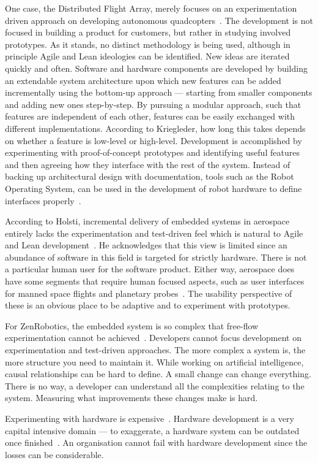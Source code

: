 \documentclass[english]{tktltiki2}
\begin{document}
One case, the Distributed Flight Array, merely focuses on an experimentation driven approach on developing autonomous quadcopters~\cite{Kri15}. The development is not focused in building a product for customers, but rather in studying involved prototypes. As it stands, no distinct methodology is being used, although in principle Agile and Lean ideologies can be identified. New ideas are iterated quickly and often. Software and hardware components are developed by building an extendable system architecture upon which new features can be added incrementally using the bottom-up approach — starting from smaller components and adding new ones step-by-step. By pursuing a modular approach, such that features are independent of each other, features can be easily exchanged with different implementations. According to Kriegleder, how long this takes depends on whether a feature is low-level or high-level. Development is accomplished by experimenting with proof-of-concept prototypes and identifying useful features and then agreeing how they interface with the rest of the system. Instead of backing up architectural design with documentation, tools such as the Robot Operating System, can be used in the development of robot hardware to define interfaces properly~\cite{ROS}.

According to Holsti, incremental delivery of embedded systems in aerospace entirely lacks the experimentation and test-driven feel which is natural to Agile and Lean development~\cite{Hol15b}. He acknowledges that this view is limited since an abundance of software in this field is targeted for strictly hardware. There is not a particular human user for the software product. Either way, aerospace does have some segments that require human focused aspects, such as user interfaces for manned space flights and planetary probes~\cite{Hol15b}. The usability perspective of these is an obvious place to be adaptive and to experiment with prototypes.

For ZenRobotics, the embedded system is so complex that free-flow experimentation cannot be achieved~\cite{Hol15a}. Developers cannot focus development on experimentation and test-driven approaches. The more complex a system is, the more structure you need to maintain it. While working on artificial intelligence, causal relationships can be hard to define. A small change can change everything. There is no way, a developer can understand all the complexities relating to the system. Measuring what improvements these changes make is hard.

Experimenting with hardware is expensive~\cite{BT15, Hol15a, Hol15b}. Hardware development is a very capital intensive domain — to exaggerate, a hardware system can be outdated once finished~\cite{Hol15a}. An organisation cannot fail with hardware development since the losses can be considerable.
\end{document}
